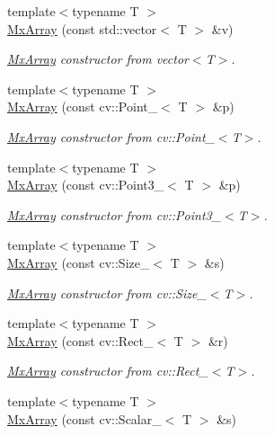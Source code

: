 \begin{DoxyCompactItemize}
{\footnotesize template$<$typename T $>$ }\\\hyperlink{class_mx_array_a614bce9d9f9ebf0e9dbb49847e4e82ed}{\-Mx\-Array} (const std\-::vector$<$ \-T $>$ \&v)
\begin{DoxyCompactList}\small\item\em \hyperlink{class_mx_array}{\-Mx\-Array} constructor from vector$<$\-T$>$. \end{DoxyCompactList}\item 
{\footnotesize template$<$typename T $>$ }\\\hyperlink{class_mx_array_a8407fc80904b6a6fec3d157879cbc87b}{\-Mx\-Array} (const cv\-::\-Point\-\_\-$<$ \-T $>$ \&p)
\begin{DoxyCompactList}\small\item\em \hyperlink{class_mx_array}{\-Mx\-Array} constructor from cv\-::\-Point\-\_\-$<$\-T$>$. \end{DoxyCompactList}\item 
{\footnotesize template$<$typename T $>$ }\\\hyperlink{class_mx_array_ab3a3a3b1f58fade86c5ae8ca2ec81dc7}{\-Mx\-Array} (const cv\-::\-Point3\-\_\-$<$ \-T $>$ \&p)
\begin{DoxyCompactList}\small\item\em \hyperlink{class_mx_array}{\-Mx\-Array} constructor from cv\-::\-Point3\-\_\-$<$\-T$>$. \end{DoxyCompactList}\item 
{\footnotesize template$<$typename T $>$ }\\\hyperlink{class_mx_array_a2347496d77055a6d52f190b89ffed563}{\-Mx\-Array} (const cv\-::\-Size\-\_\-$<$ \-T $>$ \&s)
\begin{DoxyCompactList}\small\item\em \hyperlink{class_mx_array}{\-Mx\-Array} constructor from cv\-::\-Size\-\_\-$<$\-T$>$. \end{DoxyCompactList}\item 
{\footnotesize template$<$typename T $>$ }\\\hyperlink{class_mx_array_af9af80ce387fd81ab7ae588121e06e45}{\-Mx\-Array} (const cv\-::\-Rect\-\_\-$<$ \-T $>$ \&r)
\begin{DoxyCompactList}\small\item\em \hyperlink{class_mx_array}{\-Mx\-Array} constructor from cv\-::\-Rect\-\_\-$<$\-T$>$. \end{DoxyCompactList}\item 
{\footnotesize template$<$typename T $>$ }\\\hyperlink{class_mx_array_ab9fc8869dbb26521f6ddb7c7ac46659e}{\-Mx\-Array} (const cv\-::\-Scalar\-\_\-$<$ \-T $>$ \&s)

\end{DoxyCompactItemize}
